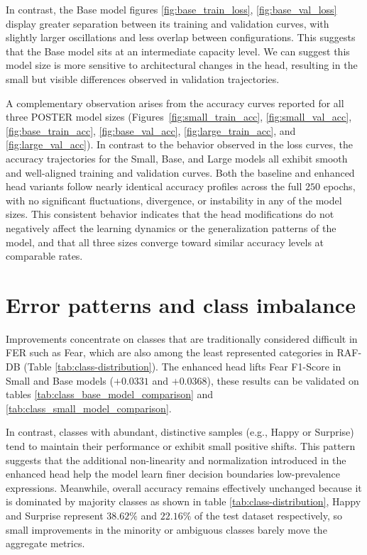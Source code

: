 In contrast, the Base model figures \ref{fig:base_train_loss}, \ref{fig:base_val_loss} display greater separation between its training and validation curves, with slightly larger oscillations and less overlap between configurations. This suggests that the Base model sits at an intermediate capacity level. We can suggest this model size  is more sensitive to architectural changes in the head, resulting in the small but visible differences observed in validation trajectories.


A complementary observation arises from the accuracy curves reported for all three POSTER model sizes (Figures~\ref{fig:small_train_acc}, 
\ref{fig:small_val_acc}, \ref{fig:base_train_acc}, \ref{fig:base_val_acc}, \ref{fig:large_train_acc}, and \ref{fig:large_val_acc}). In contrast to the behavior observed in the loss curves, the accuracy trajectories for the Small, Base, and Large models all exhibit smooth and well-aligned training and validation curves. Both the baseline and enhanced head variants follow nearly identical accuracy profiles across the full $250$ epochs, with no significant fluctuations, divergence, or instability in any of the model sizes. This consistent behavior indicates that the head modifications do 
not negatively affect the learning dynamics or the generalization patterns of the model, and that all three sizes converge toward similar accuracy levels at comparable 
rates.

\section{Error patterns and class imbalance}


Improvements concentrate on classes that are traditionally considered difficult in \gls{FER} such as Fear, which are also among the least represented categories in RAF-DB (Table \ref{tab:class-distribution}). The enhanced head lifts Fear F1-Score in Small and Base models ($+0.0331$ and $+0.0368$), these results can be validated on tables \ref{tab:class_base_model_comparison} and 
\ref{tab:class_small_model_comparison}. 

In contrast, classes with abundant, distinctive samples (e.g., Happy or Surprise) ~\cite{kollias_affect_2021, zhang_leave_2023, wang_survey_2024} tend to maintain their performance or exhibit small positive shifts. This pattern suggests that the additional non-linearity and normalization introduced in the enhanced head help the model learn finer decision boundaries low-prevalence expressions. Meanwhile, overall accuracy remains effectively unchanged because it is dominated by majority classes as shown in table \ref{tab:class-distribution}, Happy and Surprise represent $38.62 \%$ and $22.16 \%$ of the test dataset respectively, so small improvements in the  minority or ambiguous classes barely move the aggregate metrics.


